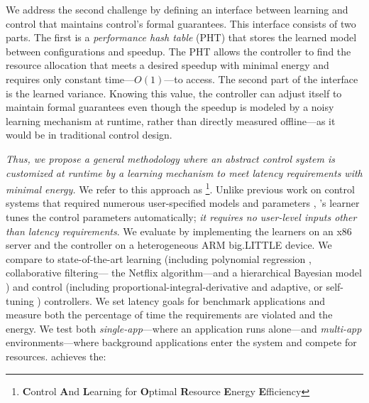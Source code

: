 We address the second challenge by defining an interface between
learning and control that maintains control's formal guarantees.  This
interface consists of two parts.  The first is a \emph{performance
  hash table} (PHT) that stores the learned model between
configurations and speedup.  The PHT allows the controller to find the
resource allocation that meets a desired speedup with minimal energy
and requires only constant time---$O(1)$---to access.  The second part
of the interface is the learned variance.  Knowing this value, the
controller can adjust itself to maintain formal guarantees even though
the speedup is modeled by a noisy learning mechanism at runtime,
rather than directly measured offline---as it would be in traditional
control design.


\emph{Thus, we propose a general methodology where an abstract control
  system is customized at runtime by a learning mechanism to meet
  latency requirements with minimal energy.} We refer to this
approach as \SYSTEM{}\footnote{\textbf{C}ontrol \textbf{A}nd
  \textbf{L}earning for \textbf{O}ptimal \textbf{R}esource
  \textbf{E}nergy \textbf{E}fficiency}.  Unlike previous work on
control systems that required numerous user-specified models and
parameters \cite{METE,Chen2011,POET,ControlWare,Agilos}, \SYSTEM{}'s
learner tunes the control parameters automatically; \ie{} \emph{it
  requires no user-level inputs other than latency requirements}.
We evaluate \SYSTEM{} by implementing the learners on an x86 server
and the controller on a heterogeneous ARM big.LITTLE device.  We
compare to state-of-the-art learning (including polynomial regression
\cite{Koala,dubach2010}, collaborative filtering---\ie{} the Netflix
algorithm\cite{netflix,Paragon}---and a hierarchical Bayesian model
\cite{LEO}) and control (including proportional-integral-derivative
\cite{Hellerstein2004a} and adaptive, or self-tuning
\cite{HandbookControl}) controllers.  We set latency goals for
benchmark applications and measure both the percentage of time the
requirements are violated and the energy.  We test both
\emph{single-app}---where an application runs alone---and
\emph{multi-app} environments---where background applications enter
the system and compete for resources.  \SYSTEM{} achieves the:
